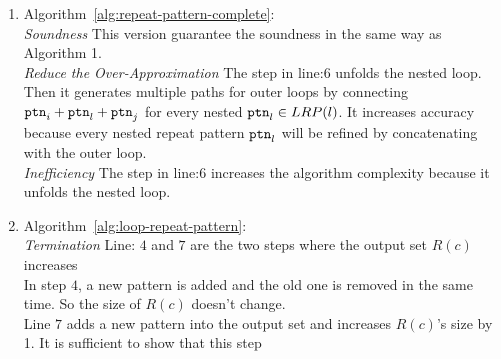 \begin{enumerate}
\item
Algorithm~\ref{alg:repeat-pattern-complete}: 
\\
\emph{Soundness}
This version guarantee the soundness in the same way as Algorithm 1.
\\
\emph{Reduce the Over-Approximation}
The step in line:6
unfolds the nested loop.
Then it generates multiple paths for outer loops by connecting $\mathtt{ptn}_i + \mathtt{ptn}_l + \mathtt{ptn}_j$ for every nested $\mathtt{ptn}_l \in LRP(l)$. 
It increases accuracy because every nested repeat pattern $\mathtt{ptn}_l$
will be refined by concatenating with the outer loop.
\\
\emph{Inefficiency}
The step in line:6 increases the algorithm complexity because it unfolds the nested loop.
\item Algorithm~\ref{alg:loop-repeat-pattern}: 
\\
\emph{Termination}
Line: $4$ and $7$ are the two steps where the output set $R(c)$ increases
\\
In step $4$, a new pattern is added and the old one is removed in the same time.
So the size of $R(c)$ doesn't change.
\\
Line $7$ adds a new pattern into the output set and increases $R(c)$'s size by 1. 
It is sufficient to show that this step

\end{enumerate}
